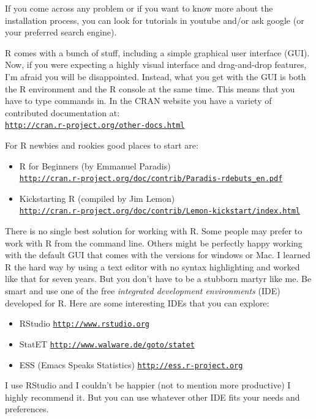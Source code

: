 \documentclass[12pt]{book}\usepackage{graphicx, color}
\begin{document}
If you come across any problem or if you want to know more about the installation process, you can look for tutorials in youtube and/or ask google (or your preferred search engine).

R comes with a bunch of stuff, including a simple graphical user interface (GUI). Now, if you were expecting a highly visual interface and drag-and-drop features, I'm afraid you will be disappointed. Instead, what you get with the GUI is both the R environment and the R console at the same time. This means that you have to type commands in. In the CRAN website you have a variety of contributed documentation at: \\ 
\texttt{\href{http://cran.r-project.org/other-docs.html}{http://cran.r-project.org/other-docs.html}}

For R newbies and rookies good places to start are: 
\begin{itemize}
 \item R for Beginners (by Emmanuel Paradis) \\ 
 \texttt{\href{http://cran.r-project.org/doc/contrib/Paradis-rdebuts\_en.pdf}{http://cran.r-project.org/doc/contrib/Paradis-rdebuts\_en.pdf}}
 \item Kickstarting R (compiled by Jim Lemon) \\ 
 \texttt{\href{http://cran.r-project.org/doc/contrib/Lemon-kickstart/index.html}{http://cran.r-project.org/doc/contrib/Lemon-kickstart/index.html}}
\end{itemize}

There is no single best solution for working with R. Some people may prefer to work with R from the command line. Others might be perfectly happy working with the default GUI that comes with the versions for windows or Mac. I learned R the hard way by using a text editor with no syntax highlighting and worked like that for seven years. But you don't have to be a stubborn martyr like me. Be smart and use one of the free \textit{integrated development environments} (IDE) developed for R. Here are some interesting IDEs that you can explore:
\begin{itemize}
 \item RStudio \texttt{\href{http://www.rstudio.org}{http://www.rstudio.org}}
 \item StatET \texttt{\href{http://www.walware.de/goto/statet}{http://www.walware.de/goto/statet}}
 \item ESS (Emacs Speaks Statistics) \texttt{\href{http://ess.r-project.org}{http://ess.r-project.org}}
\end{itemize}
I use RStudio and I couldn't be happier (not to mention more productive) I highly recommend it. But you can use whatever other IDE fits your needs and preferences.
\end{document}
